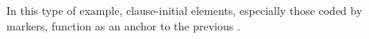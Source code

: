 
In this type of example,
clause-initial elements, especially those coded by  markers, function as an anchor to the previous .

